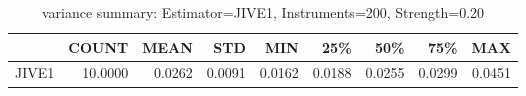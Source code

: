 \begin{table}[ht]
\centering
\caption{variance summary: Estimator=JIVE1, Instruments=200, Strength=0.20}
\begin{tabular}{lrrrrrrrr}
\toprule
 & COUNT & MEAN & STD & MIN & 25\% & 50\% & 75\% & MAX \\
\midrule
JIVE1 & 10.0000 & 0.0262 & 0.0091 & 0.0162 & 0.0188 & 0.0255 & 0.0299 & 0.0451 \\
\bottomrule
\end{tabular}
\end{table}
